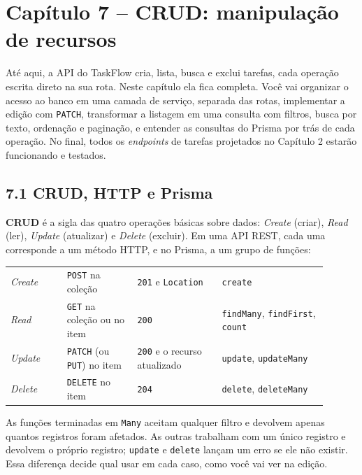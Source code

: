 \section{Capítulo 7 -- CRUD: manipulação de recursos}

Até aqui, a API do TaskFlow cria, lista, busca e exclui tarefas, cada operação escrita direto na sua rota. Neste capítulo ela fica completa. Você vai organizar o acesso ao banco em uma camada de serviço, separada das rotas, implementar a edição com \texttt{PATCH}, transformar a listagem em uma consulta com filtros, busca por texto, ordenação e paginação, e entender as consultas do Prisma por trás de cada operação. No final, todos os \textit{endpoints} de tarefas projetados no Capítulo 2 estarão funcionando e testados.

\subsection{7.1 CRUD, HTTP e Prisma}

\textbf{CRUD} é a sigla das quatro operações básicas sobre dados: \textit{Create} (criar), \textit{Read} (ler), \textit{Update} (atualizar) e \textit{Delete} (excluir). Em uma API REST, cada uma corresponde a um método HTTP, e no Prisma, a um grupo de funções:

\begin{center}
\begin{tabular}{@{}P{0.16\linewidth}P{0.2\linewidth}P{0.24\linewidth}P{0.3\linewidth}@{}}
\toprule
{}
 &  &  &  \\
\midrule
\textit{Create} & \texttt{POST} na coleção & \texttt{201} e \texttt{Location} & \texttt{create} \\
 \textit{Read} & \texttt{GET} na coleção ou no item & \texttt{200} & \texttt{findMany}, \texttt{findFirst}, \texttt{count} \\
\textit{Update} & \texttt{PATCH} (ou \texttt{PUT}) no item & \texttt{200} e o recurso atualizado & \texttt{update}, \texttt{updateMany} \\
 \textit{Delete} & \texttt{DELETE} no item & \texttt{204} & \texttt{delete}, \texttt{deleteMany} \\
\bottomrule
\end{tabular}
\end{center}

As funções terminadas em \texttt{Many} aceitam qualquer filtro e devolvem apenas quantos registros foram afetados. As outras trabalham com um único registro e devolvem o próprio registro; \texttt{update} e \texttt{delete} lançam um erro se ele não existir. Essa diferença decide qual usar em cada caso, como você vai ver na edição.

